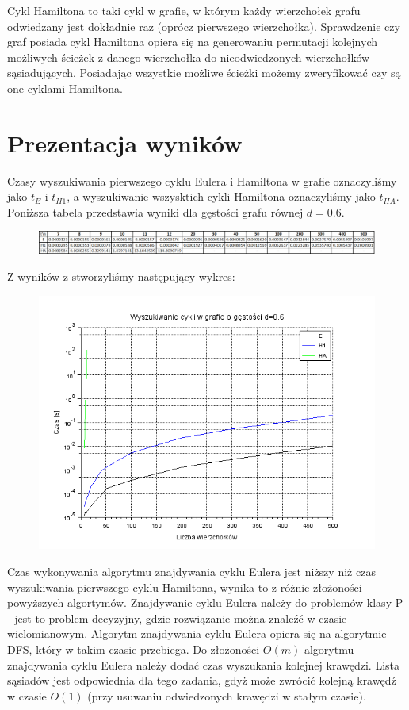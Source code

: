 \documentclass{article}
\begin{document}
Cykl Hamiltona to taki cykl w grafie, w którym każdy wierzchołek grafu odwiedzany jest dokładnie raz (oprócz pierwszego wierzchołka). Sprawdzenie czy graf posiada cykl Hamiltona opiera się na generowaniu permutacji kolejnych możliwych ścieżek z danego wierzchołka do nieodwiedzonych wierzchołków sąsiadujących. Posiadając wszystkie możliwe ścieżki możemy zweryfikować czy są one cyklami Hamiltona.

\section{Prezentacja wyników}

Czasy wyszukiwania pierwszego cyklu Eulera i Hamiltona w grafie oznaczyliśmy jako $t_E$ i $t_{H1}$, a wyszukiwanie wszysktich cykli Hamiltona oznaczyliśmy jako $t_{HA}$. Poniższa tabela przedstawia wyniki dla gęstości grafu równej $d=0.6$.

\begin{figure}[h!]
\centering
  \includegraphics[width=1.0\linewidth]{zad2_tabela.png}
\end{figure}%

Z wyników z stworzyliśmy następujący wykres:

\begin{figure}[h!]
\centering
  \includegraphics[width=0.5\linewidth]{zad2_wykres.png}
\end{figure}%

Czas wykonywania algorytmu znajdywania cyklu Eulera jest niższy niż czas wyszukiwania pierwszego cyklu Hamiltona, wynika to z różnic złożoności powyższych algortymów. Znajdywanie cyklu Eulera należy do problemów klasy P - jest to problem decyzyjny, gdzie rozwiązanie można znaleźć w czasie wielomianowym. Algorytm znajdywania cyklu Eulera opiera się na algorytmie DFS, który w takim czasie przebiega. Do złożoności $O(m)$ algorytmu znajdywania cyklu Eulera należy dodać czas wyszukania kolejnej krawędzi. Lista sąsiadów jest odpowiednia dla tego zadania, gdyż może zwrócić kolejną krawędź w czasie $O(1)$ (przy usuwaniu odwiedzonych krawędzi w stałym czasie).
\end{document}
